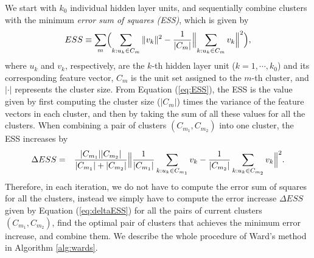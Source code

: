 \documentclass{article}
\begin{document}
We start with $k_0$ individual hidden layer units, and sequentially combine clusters with the minimum \textit{error sum of squares (ESS)}, which is given by
\begin{eqnarray}
ESS \equiv \sum_m \Bigl( \sum_{k: u_k\in C_m} \|v_k\|^2 -\frac{1}{|C_m|}\Bigl\|\sum_{k: u_k\in C_m} v_k\Bigr\|^2 \Bigr), 
\label{eq:ESS}
\end{eqnarray}
where $u_k$ and $v_k$, respectively, are the $k$-th hidden layer unit ($k=1, \cdots , k_0$) and its corresponding feature vector, $C_m$ is the unit set assigned to the $m$-th cluster, and $|\cdot |$ represents the cluster size. From Equation (\ref{eq:ESS}), the ESS is the value given by first computing the cluster size ($|C_m|$) times the variance of the feature vectors in each cluster, and then by taking the sum of all these values for all the clusters. 
When combining a pair of clusters $(C_{m_1}, C_{m_2})$ into one cluster, the ESS increases by
\begin{eqnarray}
\Delta ESS &=&
\frac{|C_{m_1}||C_{m_2}|}{|C_{m_1}|+|C_{m_2}|}\Bigl\|\frac{1}{|C_{m_1}|}\sum_{k: u_k\in C_{m_1}} v_k-\frac{1}{|C_{m_2}|}\sum_{k: u_k\in C_{m_2}} v_k\Bigr\|^2. 
\label{eq:deltaESS}
\end{eqnarray}
Therefore, in each iteration, we do not have to compute the error sum of squares for all the clusters, instead we simply have to compute the error increase $\Delta ESS$ given by Equation (\ref{eq:deltaESS}) for all the pairs of current clusters $(C_{m_1}, C_{m_2})$, find the optimal pair of clusters that achieves the minimum error increase, and combine them. 
We describe the whole procedure of Ward's method in Algorithm \ref{alg:wards}. 
\end{document}
